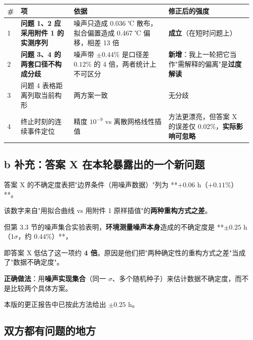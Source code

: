 \begin{center}
\small
\begin{tabular}{llll}
\toprule
\# & 项 & 依据 & 修正后的强度 \\
\midrule
1 & \textbf{问题 1、2 应采用附件 1 的实测序列} & 噪声只造成 0.036 ℃ 散布，拟合偏置造成 0.467 ℃ 偏移，相差 13 倍 & \textbf{成立}（在短时问题上） \\
2 & \textbf{问题 3、4 的两套口径不构成分歧} & 噪声带 $\pm0.44\%$ 是口径差 $0.12\%$ 的 4 倍，两者统计上不可区分 & \textbf{新增}：我上一轮把它当作"需解释的偏离"是\textbf{过度解读} \\
3 & 问题 4 表格距离列取当前构形 & 两方案一致 & 无分歧 \\
4 & 终止时刻的连续事件定位 & 精度 $10^{-9}$ vs 离散网格线性插值 & 方法更漂亮，但答案 X 的误差仅 0.02\%，\textbf{实际影响可忽略} \\
\bottomrule
\end{tabular}
\end{center}


\subsection{b 补充：答案 X 在本轮暴露出的一个新问题}


答案 X 的不确定度表把"边界条件（用噪声数据）"列为 **$+0.06$ h（$+0.11\%$）**。

该数字来自"用拟合曲线 vs 用附件 1 原样插值"的\textbf{两种重构方式之差}。


但第 3.3 节的噪声集合实验表明，\textbf{环境测量噪声本身}造成的不确定度是 **$\pm0.25$ h（$1\sigma$，约 $0.44\%$）**，

即答案 X 低估了这一项约 \textbf{4 倍}。原因是他们把"两种确定性的重构方式之差"当成了"数据不确定度"。


\textbf{正确做法}：用\textbf{噪声实现集合}（同一 $\sigma$、多个随机种子）来估计数据不确定度，而不是比较两个具体方案。

本版的更正报告中已按此方法给出 $\pm0.25$ h。


\subsection{双方都有问题的地方}


